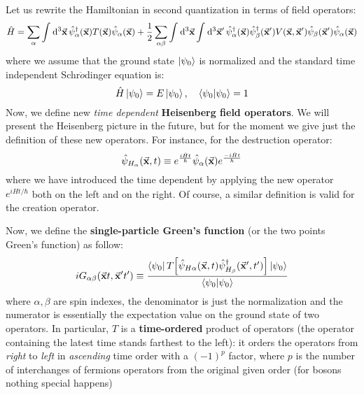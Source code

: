 \documentclass[../main/main.tex]{subfiles}
\begin{document}
Let us rewrite the Hamiltonian in second quantization in terms of field operators:
\begin{equation*}
  \hat{H} = \sum_{\alpha }^{} \int_{}^{} \dd[3]{\va{x}} \hat{\psi }_ \alpha ^\dag  (\va{x}) T (\va{x}) \hat{\psi }_ \alpha (\va{x})
  + \frac{1}{2} \sum_{\alpha \beta }^{} \int_{}^{} \dd[3]{\va{x}}
  \int_{}^{} \dd[3]{\va{x}'} \hat{\psi }_ \alpha ^\dag (\va{x})
  \hat{\psi }_ \beta ^\dag (\va{x}') V (\va{x},\va{x}') \hat{\psi }_ \beta (\va{x}') \hat{\psi }_ \alpha (\va{x})
\end{equation*}
where we assume that the ground state \( \ket{\psi _0}  \) is normalized and the standard time independent Schr$\ddot{o}$dinger equation is:
\begin{equation*}
  \hat{H} \ket{\psi _0} = E \ket{\psi _0}, \quad \braket{\psi _0}{\psi _0}= 1
\end{equation*}
Now, we define new \emph{time dependent} \textbf{Heisenberg field operators}.   We will present the Heisenberg picture in the future, but for the moment we give just the definition of these new operators.
For instance, for the destruction operator:
\begin{equation}
  \hat{\psi }_{H_ \alpha } (\va{x},t) \equiv e^{\frac{i \hat{H} t}{\hbar }} \hat{\psi }_ \alpha  (\va{x}) e^{\frac{- i \hat{H} t}{\hbar }}
  \label{eq:7_heisenberg_destruction}
\end{equation}
where we have introduced the time dependent by applying the new operator \( e^{i \hat{H}t/\hbar  }  \) both on the left and on the right. Of course, a similar definition is valid for the creation operator.

Now, we define the \textbf{ single-particle Green's function}  (or the two points Green's function)  as follow:
\begin{equation}
  i G_{\alpha \beta }(\va{x}t, \va{x}'t') \equiv \frac{\bra{\psi _0} T \qty[ \hat{\psi }_{H \alpha } (\va{x},t) \hat{\psi }_{H_ \beta }^\dag (\va{x}',t')  ] \ket{\psi _0}  }{\braket{\psi _0}{\psi _0} }
  \label{eq:7_1}
\end{equation}
where \( \alpha , \beta  \) are spin indexes, the denominator is just the normalization and the numerator is essentially the expectation value on the ground state of two operators.
In particular, \( T \) is a \textbf{time-ordered} product of operators (the operator containing the latest time stands farthest to the left): it orders the operators from \emph{right} to \emph{left} in \emph{ascending} time order with a \( (-1)^p \) factor, where \( p \) is the number of interchanges of fermions operators from the original given order (for bosons nothing special happens)
\end{document}
